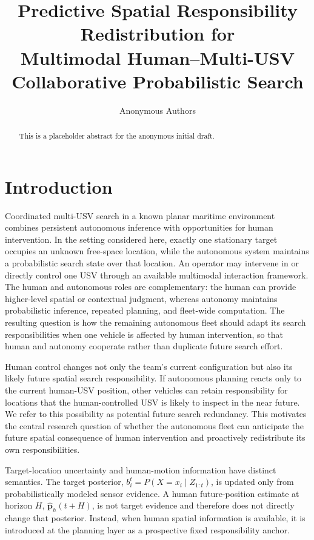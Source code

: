 \documentclass[letterpaper, 10pt, conference]{ieeeconf}
\title{Predictive Spatial Responsibility Redistribution for\\
Multimodal Human--Multi-USV Collaborative Probabilistic Search}
\author{Anonymous Authors}
\begin{document}
\maketitle

\begin{abstract}
This is a placeholder abstract for the anonymous initial draft.
\end{abstract}

\section{Introduction}

Coordinated multi-USV search in a known planar maritime environment combines persistent autonomous inference with opportunities for human intervention. In the setting considered here, exactly one stationary target occupies an unknown free-space location, while the autonomous system maintains a probabilistic search state over that location. An operator may intervene in or directly control one USV through an available multimodal interaction framework. The human and autonomous roles are complementary: the human can provide higher-level spatial or contextual judgment, whereas autonomy maintains probabilistic inference, repeated planning, and fleet-wide computation. The resulting question is how the remaining autonomous fleet should adapt its search responsibilities when one vehicle is affected by human intervention, so that human and autonomy cooperate rather than duplicate future search effort.

Human control changes not only the team's current configuration but also its likely future spatial search responsibility. If autonomous planning reacts only to the current human-USV position, other vehicles can retain responsibility for locations that the human-controlled USV is likely to inspect in the near future. We refer to this possibility as potential future search redundancy. This motivates the central research question of whether the autonomous fleet can anticipate the future spatial consequence of human intervention and proactively redistribute its own responsibilities.

Target-location uncertainty and human-motion information have distinct semantics. The target posterior, \(b_i^t=P(X=x_i\mid Z_{1:t})\), is updated only from probabilistically modeled sensor evidence. A human future-position estimate at horizon \(H\), \(\hat{\mathbf{p}}_h(t+H)\), is not target evidence and therefore does not directly change that posterior. Instead, when human spatial information is available, it is introduced at the planning layer as a prospective fixed responsibility anchor.
\end{document}
